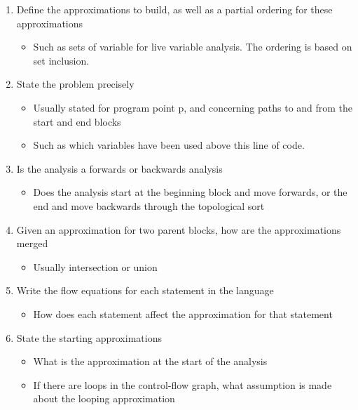 \begin{enumerate}
\item Define the approximations to build, as well as a partial ordering for these approximations
\begin{itemize}
\item Such as sets of variable for live variable analysis. The ordering is based on set inclusion.
\end{itemize}

\item State the problem precisely
\begin{itemize}
\item Usually stated for program point p, and concerning paths to and from the start and end blocks
\item Such as which variables have been used above this line of code.
\end{itemize}

\item Is the analysis a forwards or backwards analysis
\begin{itemize}
\item Does the analysis start at the beginning block and move forwards, or the end and move backwards through the topological sort
\end{itemize}

\item Given an approximation for two parent blocks, how are the approximations merged
\begin{itemize}
\item Usually intersection or union
\end{itemize}

\item Write the flow equations for each statement in the language
\begin{itemize}
\item How does each statement affect the approximation for that statement
\end{itemize}

\item State the starting approximations
\begin{itemize}
\item What is the approximation at the start of the analysis
\item If there are loops in the control-flow graph, what assumption is made about the looping approximation
\end{itemize}

\end{enumerate}


